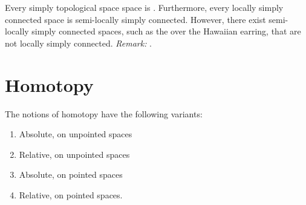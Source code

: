 

\begin{proposition}
Every simply  topological space space is . Furthermore, every locally simply connected space is semi-locally simply connected. However, there exist semi-locally simply connected spaces, such as the  over the Hawaiian earring, that are not locally simply connected.
\textit{Remark:} .
\end{proposition}








\section{Homotopy}

The notions of homotopy have the following variants:
\begin{enumerate}
    \item Absolute, on unpointed spaces
    \item Relative, on unpointed spaces
    \item Absolute, on pointed spaces
    \item Relative, on pointed spaces.
\end{enumerate}



